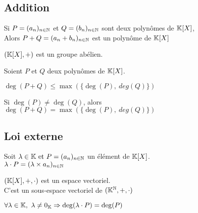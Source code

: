 \documentclass[12pt,twoside,a4paper]{article}
\begin{document}
		\subsection{Addition}
			\begin{prop}
				Si $P=(a_n)_{n\in\mathbb{N}}$ et $Q=(b_n)_{n\in\mathbb{N}}$ sont deux polynômes de $\mathbb{K}[X]$,\\
				Alors $P+Q=(a_n+b_n)_{n\in\mathbb{N}}$ est un polynôme de $\mathbb{K}[X]$
			\end{prop}
			\begin{prop}
				$(\mathbb{K}[X],+)$ est un groupe abélien.
			\end{prop}
			\begin{prop}
				Soient $P$ et $Q$ deux polynômes de $\mathbb{K}[X]$.
				\begin{liste}
					\item $\deg(P+Q)\leqslant\max(\{\deg(P),\ deg(Q) \})$
					\item Si $\deg(P)\neq \deg(Q)$, alors $\deg(P+Q)=\max(\{\deg(P),\ deg(Q) \})$
				\end{liste}
			\end{prop}
		\subsection{Loi externe}
			\begin{defi}
				Soit $\lambda\in\mathbb{K}\text{ et } P=(a_n)_{n\in\mathbb{N}}$ un élément de $\mathbb{K}[X]$.\\
				$\lambda\cdot P=(\lambda\times a_n)_{n\in\mathbb{N}}$
			\end{defi}
			\begin{prop}
				$(\mathbb{K}[X],+,\cdot)$ est un espace vectoriel.\\
				C'est un sous-espace vectoriel de $(\mathbb{K}^{\mathbb{N}},+,\cdot)$
			\end{prop}
			\begin{prop}
				$\forall \lambda\in\mathbb{K},\ \lambda\neq 0_{\mathbb{K}}\Rightarrow \deg(\lambda\cdot P)=\deg(P)$
			\end{prop}
\end{document}
